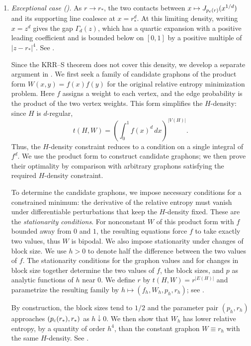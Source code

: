 \begin{enumerate}[label=(\roman*),leftmargin=2.2em]
\item \emph{Exceptional case ().}
As $r\to r_*$, the two contacts between $x\mapsto J_{p_{\mathrm c}(r)}(x^{1/d})$
and its supporting line coalesce at $x=r_*^d$.  At this limiting density,
writing $x=z^d$ gives the gap $\Gamma_d(z)$, which has a quartic expansion
with a positive leading coefficient and is bounded below on $[0,1]$ by
a positive multiple of $|z-r_*|^4$.  See .

Since the KRR--S theorem does not cover this density,
we develop a separate argument in .
We first seek a family of candidate graphons of the product form $W(x,y)=f(x)f(y)$
for the original relative entropy minimization problem.
Here $f$ assigns a weight to each vertex, and the edge probability is the
product of the two vertex weights.  This form simplifies the $H$-density:
since $H$ is $d$-regular,
\[
  t(H,W)=\left(\int_0^1 f(x)^d\,dx\right)^{|V(H)|}.
\]
Thus, the $H$-density constraint reduces to a condition on a single
integral of $f^d$.  We use the product form to construct candidate graphons;
we then prove their optimality by comparison with arbitrary graphons
satisfying the required $H$-density constraint.

To determine the candidate graphons, we impose necessary conditions for a
constrained minimum: the derivative of the relative entropy must vanish
under differentiable perturbations that keep the $H$-density fixed.
These are the \emph{stationarity conditions}.  For nonconstant $W$ of
this product form with $f$ bounded away from $0$ and $1$, the resulting equations
force $f$ to take exactly two values, thus $W$ is bipodal.  We also impose
stationarity under changes of block size.  We use $h>0$ to denote half the difference
between the two values of $f$.  The stationarity conditions for the
graphon values and for changes in block size together determine the two
values of $f$, the block sizes, and $p$ as analytic functions of $h$
near $0$.  We define $r$ by $t(H,W)=r^{|E(H)|}$ and parametrize the resulting
family by $h \mapsto (f_h,W_h,p_h,r_h)$; see .

By construction, the block sizes tend to $1/2$ and the parameter pair
$(p_h,r_h)$ approaches $(p_{\mathrm c}(r_*),r_*)$ as $h\downarrow0$.
We then show that $W_h$ has lower relative entropy, by a quantity of order
$h^4$, than the constant graphon $W\equiv r_h$ with the same $H$-density.
See .


\end{enumerate}
